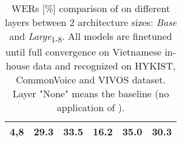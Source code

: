 \begin{table}[!ht]
\begin{adjustbox}{width=0.8\columnwidth,center}
\begin{tabular}{|c|c|c|c|c|c|}
\hline
4,8   & 29.3                   & 33.5                   & 16.2                   & 35.0                   & 30.3                    \\
\hline
\end{tabular}
\end{adjustbox}
\caption{
    \glspl{WER} {[}\%{]} comparison of  on different layers between 2 architecture sizes: \textit{Base} and \textit{Large}\textsubscript{1-8}.
    All models are finetuned until full convergence on Vietnamese in-house data and recognized on HYKIST, CommonVoice and VIVOS dataset.
    Layer "None" means the baseline (no application of ).
    }
\label{WER_intLoss_multiple_layer}
\end{table}